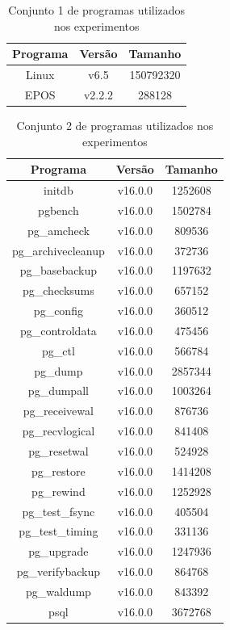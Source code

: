 \begin{table}[htb]
    \centering
    
    \begin{tabular}{|c|c|c|}
        \hline
        Programa & Versão  & Tamanho\\
        \hline
        Linux & v6.5 & 150792320 \\
        \hline
        EPOS & v2.2.2 & 288128 \\
        \hline
    \end{tabular}
    \caption{Conjunto 1 de programas utilizados nos experimentos}
    \label{tab:prog_1}
\end{table}

\begin{table}[htb]
    \centering
    
    \begin{tabular}{|c|c|c|}
        \hline
        Programa & Versão  & Tamanho\\
        \hline
        initdb & v16.0.0 & 1252608 \\
        \hline
        pgbench & v16.0.0 & 1502784 \\
        \hline
        pg\_amcheck & v16.0.0 & 809536 \\
        \hline
        pg\_archivecleanup & v16.0.0 & 372736 \\
        \hline
        pg\_basebackup & v16.0.0 & 1197632 \\
        \hline
        pg\_checksums & v16.0.0 & 657152 \\
        \hline
        pg\_config & v16.0.0 & 360512 \\
        \hline
        pg\_controldata & v16.0.0 & 475456 \\
        \hline
        pg\_ctl & v16.0.0 & 566784 \\
        \hline
        pg\_dump & v16.0.0 & 2857344 \\
        \hline
        pg\_dumpall & v16.0.0 & 1003264 \\
        \hline
        pg\_receivewal & v16.0.0 & 876736 \\
        \hline
        pg\_recvlogical & v16.0.0 & 841408 \\
        \hline
        pg\_resetwal & v16.0.0 & 524928 \\
        \hline
        pg\_restore & v16.0.0 & 1414208 \\
        \hline
        pg\_rewind & v16.0.0 & 1252928 \\
        \hline
        pg\_test\_fsync & v16.0.0 & 405504 \\
        \hline
        pg\_test\_timing & v16.0.0 & 331136 \\
        \hline
        pg\_upgrade & v16.0.0 & 1247936 \\
        \hline
        pg\_verifybackup & v16.0.0 & 864768 \\
        \hline
        pg\_waldump & v16.0.0 & 843392 \\
        \hline
        psql & v16.0.0 & 3672768 \\
        \hline
    \end{tabular}
    \caption{Conjunto 2 de programas utilizados nos experimentos}
    \label{tab:prog_2}
\end{table}
